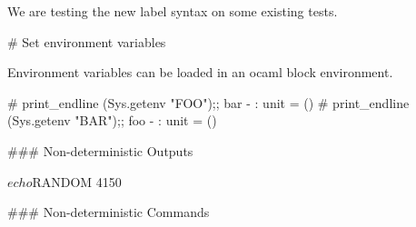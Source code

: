 We are testing the new label syntax on some existing tests.

# Set environment variables

Environment variables can be loaded in an ocaml block environment.

\begin{ocaml}
  # print_endline (Sys.getenv "FOO");;
  bar
  - : unit = ()
  # print_endline (Sys.getenv "BAR");;
  foo
  - : unit = ()
\end{ocaml}

### Non-deterministic Outputs

\begin{sh}
$ echo $RANDOM
4150
\end{sh}

### Non-deterministic Commands


